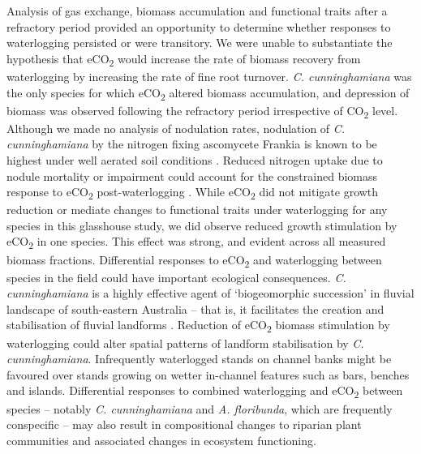 \documentclass[12pt,a4paper]{memoir}
\begin{document}
Analysis of gas exchange, biomass accumulation and functional traits after a refractory period provided an opportunity to determine whether responses to waterlogging persisted or were transitory. We were unable to substantiate the hypothesis that eCO\textsubscript{2} would increase the rate of biomass recovery from waterlogging by increasing the rate of fine root turnover. \textit{C. cunninghamiana} was the only species for which eCO\textsubscript{2} altered biomass accumulation, and depression of biomass was observed following the refractory period irrespective of CO\textsubscript{2} level. Although we made no analysis of nodulation rates, nodulation of \textit{C. cunninghamiana} by the nitrogen fixing ascomycete Frankia is known to be highest under well aerated soil conditions \citep{Dawson1989}. Reduced nitrogen uptake due to nodule mortality or impairment could account for the constrained biomass response to eCO\textsubscript{2} post-waterlogging \citep{Reich2006}. While eCO\textsubscript{2} did not mitigate growth reduction or mediate changes to functional traits under waterlogging for any species in this glasshouse study, we did observe reduced growth stimulation by eCO\textsubscript{2} in one species. This effect was strong, and evident across all measured biomass fractions. Differential responses to eCO\textsubscript{2} and waterlogging between species in the field could have important ecological consequences. \textit{C. cunninghamiana} is a highly effective agent of ‘biogeomorphic succession’ in fluvial landscape of south-eastern Australia – that is, it facilitates the creation and stabilisation of fluvial landforms \citep{Erskine2009}. Reduction of eCO\textsubscript{2} biomass stimulation by waterlogging could alter spatial patterns of landform stabilisation by \textit{C. cunninghamiana}. Infrequently waterlogged stands on channel banks might be favoured over stands growing on wetter in-channel features such as bars, benches and islands. Differential responses to combined waterlogging and eCO\textsubscript{2} between species – notably \textit{C. cunninghamiana} and \textit{A. floribunda}, which are frequently conspecific – may also result in compositional changes to riparian plant communities and associated changes in ecosystem functioning.
\end{document}
